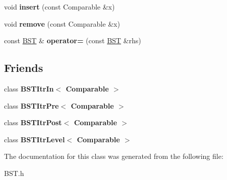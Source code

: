 \begin{DoxyCompactItemize}
\item 
\hypertarget{class_b_s_t_a2b117df6521c7d61dac75ff2c938bae7}{}void {\bfseries insert} (const Comparable \&x)\label{class_b_s_t_a2b117df6521c7d61dac75ff2c938bae7}

\item 
\hypertarget{class_b_s_t_a6f01a0b44daf82a42022b6eb4c0df7a2}{}void {\bfseries remove} (const Comparable \&x)\label{class_b_s_t_a6f01a0b44daf82a42022b6eb4c0df7a2}

\item 
\hypertarget{class_b_s_t_aa80c39f454c89d4a202be3d1445823f3}{}const \hyperlink{class_b_s_t}{B\+S\+T} \& {\bfseries operator=} (const \hyperlink{class_b_s_t}{B\+S\+T} \&rhs)\label{class_b_s_t_aa80c39f454c89d4a202be3d1445823f3}

\end{DoxyCompactItemize}
\subsection*{Friends}
\begin{DoxyCompactItemize}
\item 
\hypertarget{class_b_s_t_aab3993acac2ab24a0b59edb0c3acc775}{}class {\bfseries B\+S\+T\+Itr\+In$<$ Comparable $>$}\label{class_b_s_t_aab3993acac2ab24a0b59edb0c3acc775}

\item 
\hypertarget{class_b_s_t_a45a55df6f11541416d4ea7684c575c1a}{}class {\bfseries B\+S\+T\+Itr\+Pre$<$ Comparable $>$}\label{class_b_s_t_a45a55df6f11541416d4ea7684c575c1a}

\item 
\hypertarget{class_b_s_t_a5dc153694be266f6e772659486219da7}{}class {\bfseries B\+S\+T\+Itr\+Post$<$ Comparable $>$}\label{class_b_s_t_a5dc153694be266f6e772659486219da7}

\item 
\hypertarget{class_b_s_t_a26ff00bc0d87069aed877f10fd3c80a8}{}class {\bfseries B\+S\+T\+Itr\+Level$<$ Comparable $>$}\label{class_b_s_t_a26ff00bc0d87069aed877f10fd3c80a8}

\end{DoxyCompactItemize}


The documentation for this class was generated from the following file\+:\begin{DoxyCompactItemize}
\item 
B\+S\+T.\+h\end{DoxyCompactItemize}
